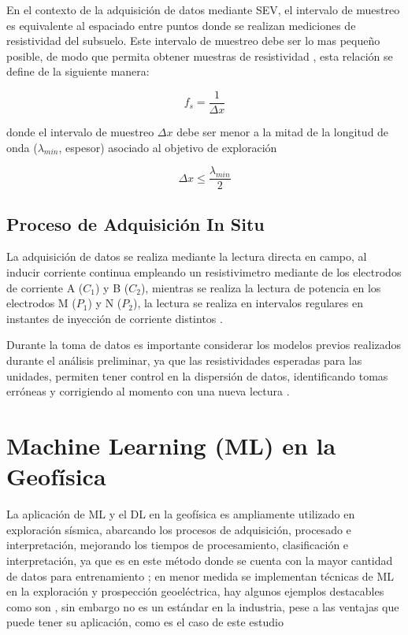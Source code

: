 				En el contexto de la adquisición de datos mediante SEV, el intervalo de muestreo es equivalente al espaciado entre puntos donde se realizan mediciones de resistividad del subsuelo. Este intervalo de muestreo debe ser lo mas pequeño posible, de modo que permita obtener muestras de resistividad \citep{telford1990}, esta relación se define de la siguiente manera:
				
				\begin{equation}
					f_{s}= \frac{1}{\Delta x}
				\end{equation}
				
				donde el intervalo de muestreo $\Delta x$ debe ser menor a la mitad de la longitud de onda ($\lambda_{min}$, espesor) asociado al objetivo de exploración
				
				\begin{equation}
					\Delta x \leq \frac{\lambda_{min} }{2}
				\end{equation}
			
		\subsection{Proceso de Adquisición In Situ}
			La adquisición de datos se realiza mediante la lectura directa en campo, al inducir corriente continua empleando un resistivimetro mediante de los electrodos de corriente A ($C_{1}$) y B ($C_{2}$), mientras se realiza la lectura de potencia en los electrodos M ($P_{1}$) y N ($P_{2}$), la lectura se realiza en intervalos regulares en instantes de inyección de corriente distintos \citep{telford1990}.
			
			Durante la toma de datos es importante considerar los modelos previos realizados durante el análisis preliminar, ya que las resistividades esperadas para las unidades, permiten tener control en la dispersión de datos, identificando tomas erróneas y corrigiendo al momento con una nueva lectura \citep{telford1990}.
	
	\section{Machine Learning (ML) en la Geofísica}  
	
	La aplicación de ML y el DL en la geofísica es ampliamente utilizado en exploración sísmica, abarcando los procesos de adquisición, procesado e interpretación, mejorando los tiempos de procesamiento, clasificación e interpretación, ya que es en este método donde se cuenta con la mayor cantidad de datos para entrenamiento \citep{wrona2018}; en menor medida se implementan técnicas de ML en la exploración y prospección geoeléctrica, hay algunos ejemplos destacables como son \cite{liu2020, el2001, li2024}, sin embargo no es un estándar en la industria, pese a las ventajas que puede tener su aplicación, como es el caso de este estudio
		
